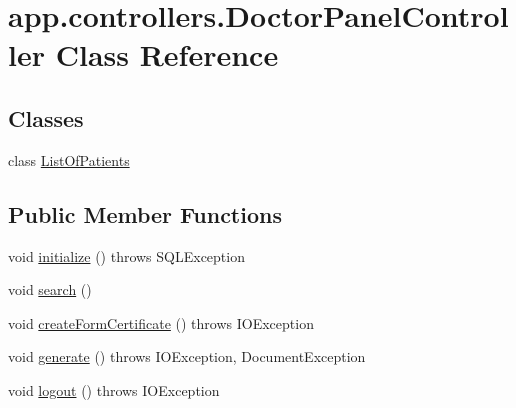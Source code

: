 \hypertarget{classapp_1_1controllers_1_1_doctor_panel_controller}{}\section{app.\+controllers.\+Doctor\+Panel\+Controller Class Reference}
\label{classapp_1_1controllers_1_1_doctor_panel_controller}
\subsection*{Classes}
\begin{DoxyCompactItemize}
\item 
class \mbox{\hyperlink{classapp_1_1controllers_1_1_doctor_panel_controller_1_1_list_of_patients}{List\+Of\+Patients}}
\end{DoxyCompactItemize}
\subsection*{Public Member Functions}
\begin{DoxyCompactItemize}
\item 
void \mbox{\hyperlink{classapp_1_1controllers_1_1_doctor_panel_controller_ad232f5938d2f2b2a12707ac6bf0db2a7}{initialize}} ()  throws S\+Q\+L\+Exception 
\item 
void \mbox{\hyperlink{classapp_1_1controllers_1_1_doctor_panel_controller_a0417501b80b9148596978de451424b88}{search}} ()
\item 
void \mbox{\hyperlink{classapp_1_1controllers_1_1_doctor_panel_controller_a6f6ead0296b1f1045116f84b6b3efe90}{create\+Form\+Certificate}} ()  throws I\+O\+Exception 
\item 
void \mbox{\hyperlink{classapp_1_1controllers_1_1_doctor_panel_controller_a90a301adeea72b07910035e0e188d91c}{generate}} ()  throws I\+O\+Exception, Document\+Exception 
\item 
void \mbox{\hyperlink{classapp_1_1controllers_1_1_doctor_panel_controller_a1e3355f76eb264a960f7e88694d21478}{logout}} ()  throws I\+O\+Exception 
\end{DoxyCompactItemize}
